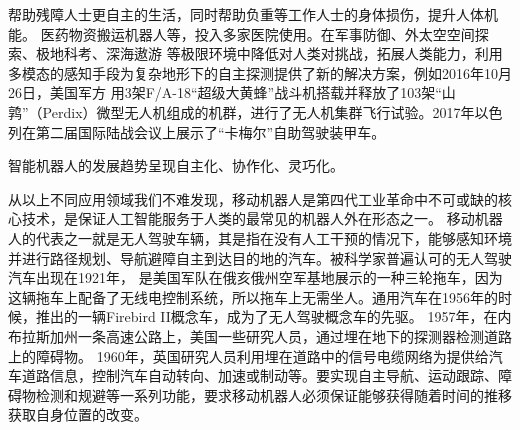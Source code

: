 帮助残障人士更自主的生活，同时帮助负重等工作人士的身体损伤，提升人体机能。%
医药物资搬运机器人等，投入多家医院使用。在军事防御、外太空空间探索、极地科考、深海遨游%
等极限环境中降低对人类对挑战，拓展人类能力，利用多模态的感知手段为复杂地形下的自主探测提供了新的解决方案，例如2016年10月26日，美国军方
用3架F/A-18“超级大黄蜂”战斗机搭载并释放了103架“山鹑”（Perdix）微型无人机组成的机群，进行了无人机集群飞行试验。2017年以色列在第二届国际陆战会议上展示了“卡梅尔”自助驾驶装甲车。

智能机器人的发展趋势呈现自主化、协作化、灵巧化。
    
从以上不同应用领域我们不难发现，移动机器人是第四代工业革命中不可或缺的核心技术，是保证人工智能服务于人类的最常见的机器人外在形态之一。%
移动机器人的代表之一就是无人驾驶车辆，其是指在没有人工干预的情况下，能够感知环境并进行路径规划、导航避障自主到达目的地的汽车。被科学家普遍认可的无人驾驶汽车出现在1921年，
是美国军队在俄亥俄州空军基地展示的一种三轮拖车，因为这辆拖车上配备了无线电控制系统，所以拖车上无需坐人。通用汽车在1956年的时候，推出的一辆Firebird II概念车，成为了无人驾驶概念车的先驱。
1957年，在内布拉斯加州一条高速公路上，美国一些研究人员，通过埋在地下的探测器检测道路上的障碍物。
1960年，英国研究人员利用埋在道路中的信号电缆网络为提供给汽车道路信息，控制汽车自动转向、加速或制动等。要实现自主导航、运动跟踪、障碍物检测和规避等一系列功能，要求移动机器人必须保证能够获得随着时间的推移获取自身位置的改变。

